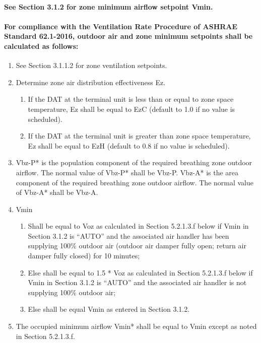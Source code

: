 \documentclass[10pt]{article}
\begin{document}
\paragraph{See Section 3.1.2 for zone minimum airflow setpoint Vmin.}

\ifdefined\ASHRAEStandard
  \paragraph{For compliance with the Ventilation Rate Procedure of ASHRAE Standard 62.1-2016, outdoor air and zone minimum setpoints shall be calculated as follows:}
  \begin{enumerate}
    \item See Section 3.1.1.2 for zone ventilation setpoints.
    \item Determine zone air distribution effectiveness Ez.
    \begin{enumerate}
      \item If the DAT at the terminal unit is less than or equal to zone space temperature, Ez shall be equal to EzC (default to 1.0 if no value is scheduled).
      \item If the DAT at the terminal unit is greater than zone space temperature, Ez shall be equal to EzH (default to 0.8 if no value is scheduled).
    \end{enumerate}
    \item Vbz-P* is the population component of the required breathing zone outdoor airflow. The normal value of Vbz-P* shall be Vbz-P. Vbz-A* is the area component of the required breathing zone outdoor airflow.  The normal value of Vbz-A* shall be Vbz-A.
    \item Vmin
    \begin{enumerate}
      \item Shall be equal to Voz as calculated in Section 5.2.1.3.f below if Vmin in Section 3.1.2 is “AUTO” and the associated air handler has been supplying 100\% outdoor air (outdoor air damper fully open; return air damper fully closed) for 10 minutes;
      \item Else shall be equal to 1.5 * Voz as calculated in Section 5.2.1.3.f below if Vmin in Section 3.1.2 is “AUTO” and the associated air handler is not supplying 100\% outdoor air;
      \item Else shall be equal Vmin as entered in Section 3.1.2.
    \end{enumerate}
    \item The occupied minimum airflow Vmin* shall be equal to Vmin except as noted in Section 5.2.1.3.f.

\end{enumerate}
\end{document}
